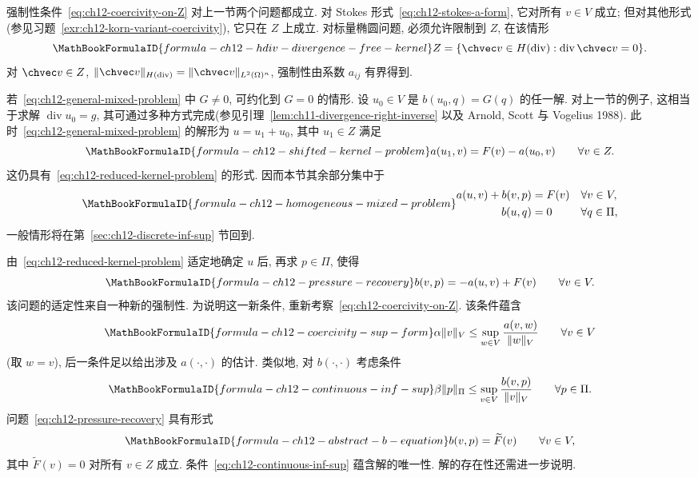 强制性条件~\eqref{eq:ch12-coercivity-on-Z} 对上一节两个问题都成立. 对 Stokes 形式~\eqref{eq:ch12-stokes-a-form}, 它对所有 $v\in V$ 成立; 但对其他形式(参见习题~\ref{exr:ch12-korn-variant-coercivity}), 它只在 $Z$ 上成立. 对标量椭圆问题, 必须允许限制到 $Z$, 在该情形
\[
\MathBookFormulaID{formula-ch12-hdiv-divergence-free-kernel}
Z=\{\chvec v\in H(\operatorname{div}):\operatorname{div}\chvec v=0\}.
\]
对 $\chvec v\in Z$, $\|\chvec v\|_{H(\operatorname{div})}=\|\chvec v\|_{L^2(\Omega)^n}$, 强制性由系数 $a_{ij}$ 有界得到.

若~\eqref{eq:ch12-general-mixed-problem} 中 $G\neq0$, 可约化到 $G=0$ 的情形. 设 $u_0\in V$ 是 $b(u_0,q)=G(q)$ 的任一解. 对上一节的例子, 这相当于求解 $\operatorname{div}u_0=g$, 其可通过多种方式完成(参见引理~\ref{lem:ch11-divergence-right-inverse} 以及 Arnold, Scott 与 Vogelius 1988). 此时~\eqref{eq:ch12-general-mixed-problem} 的解形为 $u=u_1+u_0$, 其中 $u_1\in Z$ 满足
\[
\MathBookFormulaID{formula-ch12-shifted-kernel-problem}
a(u_1,v)=F(v)-a(u_0,v)\qquad\forall v\in Z.
\]
这仍具有~\eqref{eq:ch12-reduced-kernel-problem} 的形式. 因而本节其余部分集中于
\begin{equation}
\MathBookFormulaID{formula-ch12-homogeneous-mixed-problem}
\label{eq:ch12-homogeneous-mixed-problem}
\begin{aligned}
a(u,v)+b(v,p)&=F(v)&&\forall v\in V,\\
b(u,q)&=0&&\forall q\in\Pi,
\end{aligned}
\end{equation}
一般情形将在第~\ref{sec:ch12-discrete-inf-sup} 节回到.

由~\eqref{eq:ch12-reduced-kernel-problem} 适定地确定 $u$ 后, 再求 $p\in\Pi$, 使得
\begin{equation}
\MathBookFormulaID{formula-ch12-pressure-recovery}
\label{eq:ch12-pressure-recovery}
b(v,p)=-a(u,v)+F(v)\qquad\forall v\in V.
\end{equation}
该问题的适定性来自一种新的强制性. 为说明这一新条件, 重新考察~\eqref{eq:ch12-coercivity-on-Z}. 该条件蕴含
\[
\MathBookFormulaID{formula-ch12-coercivity-sup-form}
\alpha\|v\|_V\leq\sup_{w\in V}\frac{a(v,w)}{\|w\|_V}
\qquad\forall v\in V
\]
(取 $w=v$), 后一条件足以给出涉及 $a(\cdot,\cdot)$ 的估计. 类似地, 对 $b(\cdot,\cdot)$ 考虑条件
\begin{equation}
\MathBookFormulaID{formula-ch12-continuous-inf-sup}
\label{eq:ch12-continuous-inf-sup}
\beta\|p\|_\Pi\leq
\sup_{v\in V}\frac{b(v,p)}{\|v\|_V}
\qquad\forall p\in\Pi.
\end{equation}
问题~\eqref{eq:ch12-pressure-recovery} 具有形式
\begin{equation}
\MathBookFormulaID{formula-ch12-abstract-b-equation}
\label{eq:ch12-abstract-b-equation}
b(v,p)=\widetilde F(v)\qquad\forall v\in V,
\end{equation}
其中 $\widetilde F(v)=0$ 对所有 $v\in Z$ 成立. 条件~\eqref{eq:ch12-continuous-inf-sup} 蕴含解的唯一性. 解的存在性还需进一步说明.

